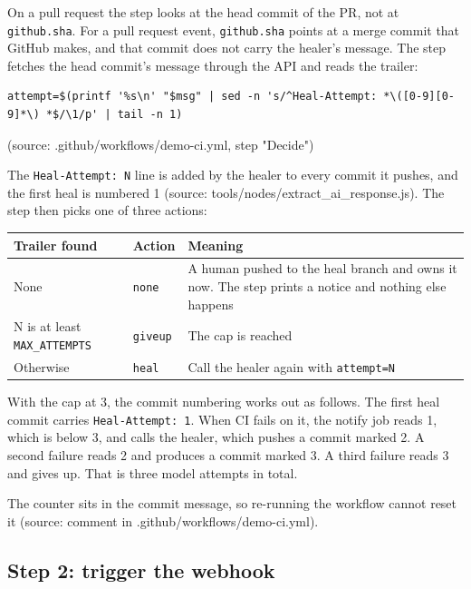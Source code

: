 \documentclass[11pt,a4paper]{report}
\begin{document}
On a pull request the step looks at the head commit of the PR, not at \texttt{github.\allowbreak{}sha}. For a pull request event, \texttt{github.\allowbreak{}sha} points at a merge commit that GitHub makes, and that commit does not carry the healer's message. The step fetches the head commit's message through the API and reads the trailer:

\begin{lstlisting}
attempt=$(printf '%s\n' "$msg" | sed -n 's/^Heal-Attempt: *\([0-9][0-9]*\) *$/\1/p' | tail -n 1)
\end{lstlisting}

(source: .github/workflows/demo-ci.yml, step "Decide")

The \texttt{Heal-\allowbreak{}Attempt: N} line is added by the healer to every commit it pushes, and the first heal is numbered 1 (source: tools/nodes/extract\_ai\_response.js). The step then picks one of three actions:

\begin{longtable}{>{\raggedright\arraybackslash}p{0.292\dimexpr\linewidth-6\tabcolsep\relax}>{\raggedright\arraybackslash}p{0.083\dimexpr\linewidth-6\tabcolsep\relax}>{\raggedright\arraybackslash}p{0.625\dimexpr\linewidth-6\tabcolsep\relax}}
\toprule
\textbf{Trailer found} & \textbf{Action} & \textbf{Meaning} \\
\midrule
\endhead
None & \texttt{none} & A human pushed to the heal branch and owns it now. The step prints a notice and nothing else happens \\
N is at least \texttt{MAX\_\allowbreak{}ATTEMPTS} & \texttt{giveup} & The cap is reached \\
Otherwise & \texttt{heal} & Call the healer again with \texttt{attempt=N} \\
\bottomrule
\end{longtable}

With the cap at 3, the commit numbering works out as follows. The first heal commit carries \texttt{Heal-\allowbreak{}Attempt: 1}. When CI fails on it, the notify job reads 1, which is below 3, and calls the healer, which pushes a commit marked 2. A second failure reads 2 and produces a commit marked 3. A third failure reads 3 and gives up. That is three model attempts in total.

The counter sits in the commit message, so re-running the workflow cannot reset it (source: comment in .github/workflows/demo-ci.yml).

\subsection{Step 2: trigger the webhook}
\end{document}
